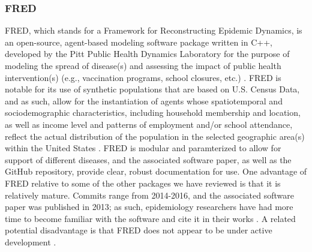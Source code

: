 \documentclass{article}
\begin{document}

\subsubsection{FRED}
FRED, which stands for a Framework for Reconstructing Epidemic Dynamics, is an open-source, agent-based modeling software package written in C++, developed by the Pitt Public Health Dynamics Laboratory for the purpose of modeling the spread of disease(s) and assessing the impact of public health intervention(s) (e.g., vaccination programs, school closures, etc.) \cite{pittir24611, fredRepo}. FRED is notable for its use of synthetic populations that are based on U.S. Census Data, and as such, allow for the instantiation of agents whose spatiotemporal and sociodemographic characteristics, including household membership and location, as well as income level and patterns of employment and/or school attendance, reflect the actual distribution of the population in the selected geographic area(s) within the United States \cite{pittir24611}. FRED is modular and paramterized to allow for support of different diseases, and the associated software paper, as well as the GitHub repository, provide clear, robust documentation for use. One advantage of FRED relative to some of the other packages we have reviewed is that it is relatively mature. Commits range from 2014-2016, and the associated software paper was published in 2013; as such, epidemiology researchers have had more time to become familiar with the software and cite it in their works \cite{pittir24611, fredRepo}. A related potential disadvantage is that FRED does not appear to be under active development \cite{pittir24611, fredRepo}.  



\end{document}
